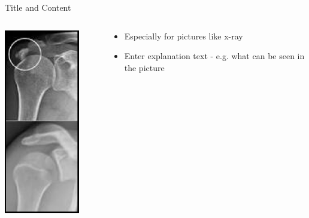 \documentclass[10pt]{beamer} %
\begin{document}
\begin{frame}{Title and Content}
\begin{columns}
\begin{column}{0.3\textwidth}
\begin{center}
     \includegraphics[width=0.8\textwidth]{Images/xray.png}
     \end{center}
  \end{column}
  \begin{column}{0.7\textwidth}  %
    \begin{itemize}
	  \item Especially for pictures like x-ray
	  \item Enter explanation text - e.g. what can be seen in the picture
	\end{itemize}
  \end{column}
\end{columns}

\end{frame}
 
\end{document}
